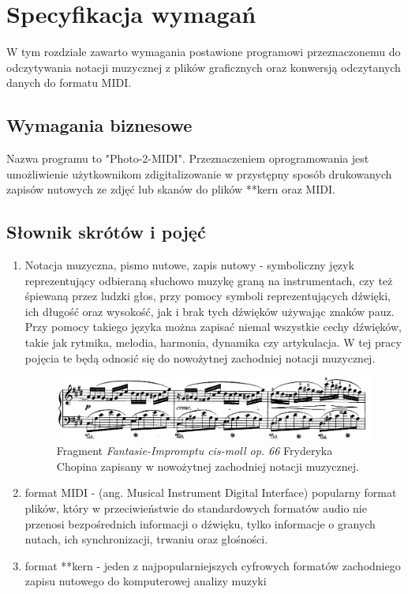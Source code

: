 \chapter{Specyfikacja wymagań}
W tym rozdziale zawarto wymagania postawione programowi przeznaczonemu do odczytywania notacji muzycznej z plików graficznych oraz konwersją odczytanych danych do formatu MIDI.

\section{Wymagania biznesowe}
Nazwa programu to "Photo-2-MIDI". Przeznaczeniem oprogramowania jest umożliwienie użytkownikom zdigitalizowanie w przystępny sposób drukowanych zapisów nutowych ze zdjęć lub skanów do plików **kern oraz MIDI.

\section{Słownik skrótów i pojęć}

	\begin{enumerate}
		\item Notacja muzyczna, pismo nutowe, zapis nutowy - symboliczny język reprezentujący odbieraną słuchowo muzykę graną na instrumentach, czy też śpiewaną przez ludzki głos, przy pomocy symboli reprezentujących dźwięki, ich długość oraz wysokość, jak i brak tych dźwięków używając znaków pauz. Przy pomocy takiego języka można zapisać niemal wszystkie cechy dźwięków, takie jak rytmika, melodia, harmonia, dynamika czy artykulacja. W tej pracy pojęcia te będą odnosić się do nowożytnej zachodniej notacji muzycznej.
		
		\begin{figure}
			\centering
			\includegraphics[width=14cm]{images/chopin_fastasie_impromtu_no_4_op_66.png}
			\caption{Fragment \textit{Fantasie-Impromptu cis-moll op. 66} Fryderyka Chopina zapisany w nowożytnej zachodniej notacji muzycznej. }
			\label{fig:chopin_impromptu}
		\end{figure}
		
		\item format MIDI - (ang. Musical Instrument Digital Interface) popularny format plików, który w przeciwieństwie do standardowych formatów audio nie przenosi bezpośrednich informacji o dźwięku, tylko informacje o granych nutach, ich synchronizacji, trwaniu oraz głośności.
		
		\item format **kern - jeden z najpopularniejszych cyfrowych formatów zachodniego zapisu nutowego do komputerowej analizy muzyki
	\end{enumerate}

